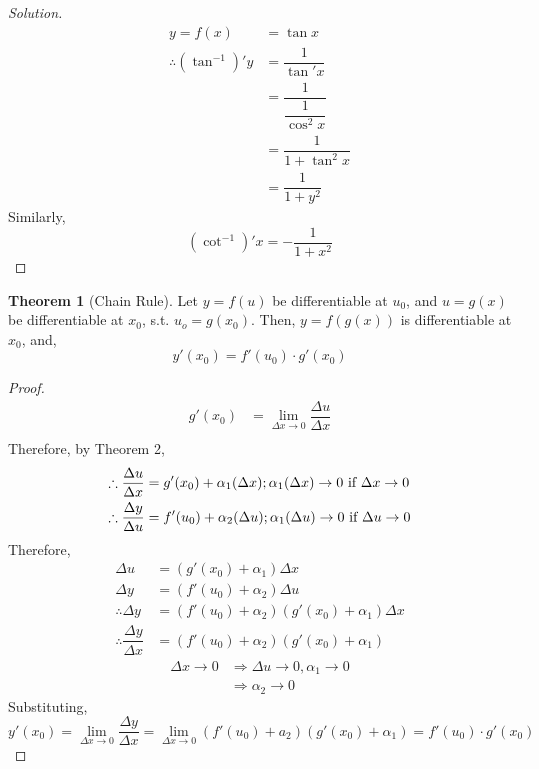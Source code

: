 \documentclass[fleqn]{article}
\theoremstyle{definition}
\theoremstyle{theorem}
\newtheorem{theorem}{Theorem}
\theoremstyle{remark}
\newenvironment{solution}
	{\begin{proof}[Solution]\let\qed\relax}
	{\end{proof}}
\begin{document}
\begin{solution}
	\begin{align*}
	y = f(x) &= \tan x \\
	\therefore (\tan^{-1})' y &= \dfrac{1}{\tan' x} \\
	&= \dfrac{1}{\dfrac{1}{\cos^2 x}} \\
	&= \dfrac{1}{1 + \tan^2 x} \\
	&= \dfrac{1}{1 + y^2}
	\end{align*}
	Similarly,
	\begin{equation*}
		(\cot^{-1})' x = - \dfrac{1}{1 + x^2} 
	\end{equation*}
\end{solution}

\begin{theorem}[Chain Rule]
	Let $y = f(u)$ be differentiable at $u_0$, and $u = g(x)$ be differentiable at $x_0$, s.t. $u_o = g(x_0)$. Then, $y = f(g(x))$ is differentiable at $x_0$, and, 
	\begin{equation*}
		y'(x_0) = f'(u_0) \cdot g'(x_0)
	\end{equation*}
\end{theorem}

\begin{proof}
	\begin{align*}
		g'(x_0) &= \lim\limits_{\Delta x \rightarrow 0} \dfrac{\Delta u}{\Delta x} \\
	\end{align*}
	Therefore, by Theorem 2, 
	\begin{align*}
		\therefore \dfrac{\Delta u}{\Delta x} &= g'(x_0) + \alpha_1(\Delta x) \hfill ; \alpha_1(\Delta x) \rightarrow 0 \text{ if } \Delta x \rightarrow 0 \\
		\therefore \dfrac{\Delta y}{\Delta u} &= f'(u_0) + \alpha_2(\Delta u) \hfill ; \alpha_1(\Delta u) \rightarrow 0 \text{ if } \Delta u \rightarrow 0
	\end{align*}
	Therefore, 
	\begin{align*}
		\Delta u &= (g'(x_0) + \alpha_1) \Delta x \\
		\Delta y &= (f'(u_0) + \alpha_2) \Delta u \\
		\therefore \Delta y &= (f'(u_0) + \alpha_2)(g'(x_0) + \alpha_1) \Delta x \\
		\therefore \dfrac{\Delta y}{\Delta x} &= (f'(u_0) + \alpha_2) (g'(x_0) + \alpha_1) 
	\end{align*}
	\begin{align*}
		\Delta x \rightarrow 0 &\Rightarrow \Delta u \rightarrow 0 , \alpha_1 \rightarrow 0 \\
		&\Rightarrow \alpha_2 \rightarrow 0
	\end{align*}
	Substituting,
	\begin{equation*}
		y'(x_0) = \lim\limits_{\Delta x \rightarrow 0} \dfrac{\Delta y}{\Delta x} = \lim\limits_{\Delta x \rightarrow 0} \left(f'(u_0) + a_2\right) \left(g'(x_0) + \alpha_1\right) = f'(u_0) \cdot g'(x_0)
	\end{equation*}
\end{proof}
\end{document}
